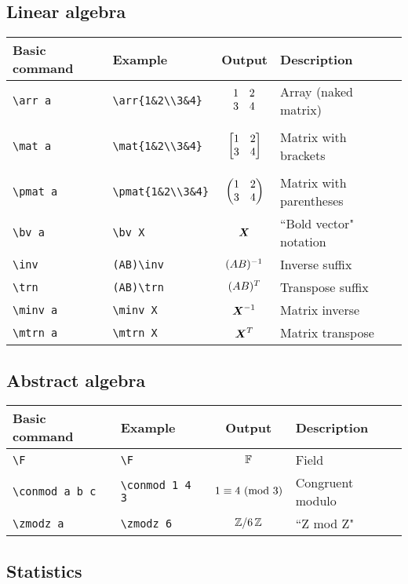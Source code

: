 \documentclass{article}
\begin{document}
\subsection*{Linear algebra}

\begin{tabular}{llc  l}
Basic command & Example &  Output & Description\\
\hline
\verb|\arr a| & \verb+\arr{1&2\\3&4}+ &  $\begin{matrix} 1&2\\3&4 \end{matrix}$ & Array (naked matrix)\\
\\
\verb|\mat a| & \verb+\mat{1&2\\3&4}+ &  $\begin{bmatrix} 1&2\\3&4 \end{bmatrix}$ & Matrix with brackets\\
\\
\verb|\pmat a| & \verb+\pmat{1&2\\3&4}+ &  $\left( \begin{matrix} 1&2\\3&4 \end{matrix} \right)$ & Matrix with parentheses\\
\verb|\bv a| & \verb|\bv X| &  $\boldsymbol{X}$ & ``Bold vector" notation\\
\verb|\inv| & \verb|(AB)\inv| &  $(AB)^{-1}$ & Inverse suffix\\
\verb|\trn| & \verb|(AB)\trn| &  $(AB)^{T}$ & Transpose suffix\\
\verb|\minv a| & \verb|\minv X| &  $\boldsymbol{X}^{-1}$ & Matrix inverse\\
\verb|\mtrn a| & \verb|\mtrn X| &  $\boldsymbol{X}^{T}$ & Matrix transpose\\
\end{tabular}

\subsection*{Abstract algebra}

\begin{tabular}{llc  l}
Basic command & Example &  Output & Description\\
\hline
\verb|\F| & \verb+\F+ &  $\mathbb{F}$ & Field\\
\verb|\conmod a b c| & \verb|\conmod 1 4 3| &  $1 \equiv 4 \, \left( \mathrm{mod} \, \, 3  \right)$ & Congruent modulo\\ 
\verb|\zmodz a| & \verb|\zmodz 6| &  $\mathbb{Z}/6 \,\mathbb{Z}$ & ``Z mod Z"\\
\end{tabular}

\subsection*{Statistics}
\end{document}
